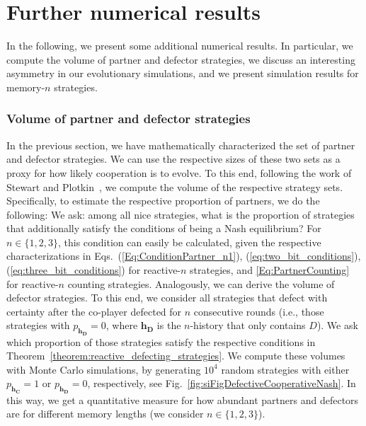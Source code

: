 \documentclass[9pt,twoside,lineno]{pnas-new}
\theoremstyle{plainCl1}
\theoremstyle{plainCl2}
\begin{document}


\section{Further numerical results}\label{section:simulations}

In the following, we present some additional numerical results. 
In particular, we compute the volume of partner and defector strategies, we discuss an interesting asymmetry in our evolutionary simulations, and we present simulation results for memory-$n$ strategies. 


\subsubsection*{Volume of partner and defector strategies}

In the previous section, we have mathematically characterized the set of partner and defector strategies. 
We can use the respective sizes of these two sets as a proxy for how likely cooperation is to evolve. 
To this end, following the work of Stewart and Plotkin~\cite{stewart:scientific:2016}, we compute the volume of the respective strategy sets. 
Specifically, to estimate the respective proportion of partners, we do the following: 
We ask: among all nice strategies, what is the proportion of strategies that additionally satisfy the conditions of being a Nash equilibrium? 
For $n\!\in\!\{1,2,3\}$, this condition can easily be calculated, given the respective characterizations in Eqs.~(\ref{Eq:ConditionPartner_n1}), (\ref{eq:two_bit_conditions}), (\ref{eq:three_bit_conditions}) for reactive-$n$ strategies, and \eqref{Eq:PartnerCounting} for reactive-$n$ counting strategies. 
Analogously, we can derive the volume of defector strategies. 
To this end, we consider all strategies that defect with certainty after the co-player defected for $n$ consecutive rounds (i.e., those strategies with $p_\mathbf{h_D}\!=\!0$, where $\mathbf{h_D}$ is the $n$-history that only contains $D$). 
We ask which proportion of those strategies satisfy the respective conditions in Theorem~\ref{theorem:reactive_defecting_strategies}. 
We compute these volumes with Monte Carlo simulations, by generating $10^4$ random strategies with either $p_\mathbf{h_C}\!=\!1$ or $p_\mathbf{h_D}\!=\!0$, respectively, see Fig.~\ref{fig:siFigDefectiveCooperativeNash}. 
In this way, we get a quantitative measure for how abundant partners and defectors are for different memory lengths (we consider $n\!\in\!\{1,2,3\}$).
\end{document}
